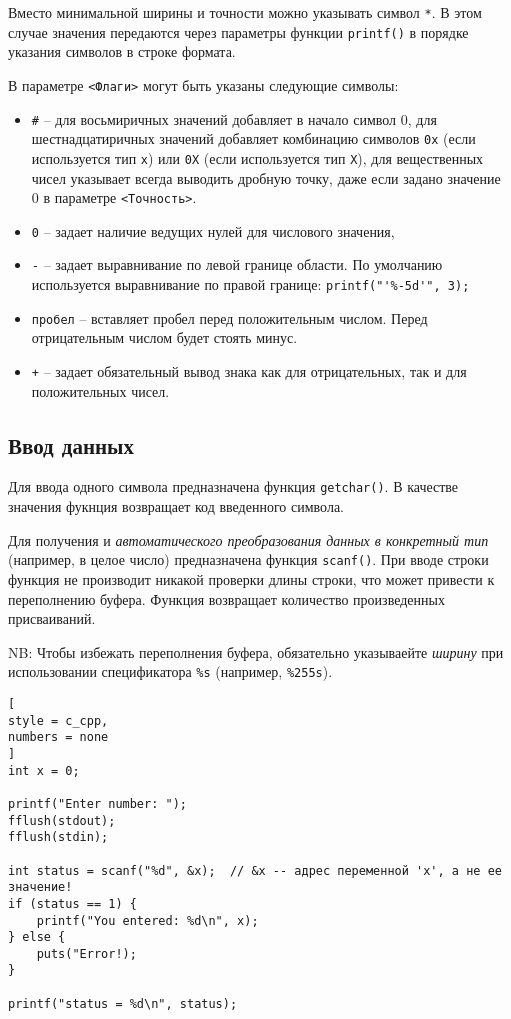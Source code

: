 \documentclass[%
	11pt,
	a4paper,
	utf8,
		]{article}
\begin{document}
Вместо минимальной ширины и точности можно указывать символ \verb*|*|. В этом случае значения передаются через параметры функции \verb*|printf()| в порядке указания символов в строке формата.

В параметре \verb|<Флаги>| могут быть указаны следующие символы:
\begin{itemize}
	\item \verb*|#| -- для восьмиричных значений добавляет в начало символ 0, для шестнадцатиричных значений добавляет комбинацию символов \verb|0x| (если используется тип \verb*|x|) или \verb|0X| (если используется тип \verb*|X|), для вещественных чисел указывает всегда выводить дробную точку, даже если задано значение 0 в параметре \verb|<Точность>|.
	
	\item \verb*|0| -- задает наличие ведущих нулей для числового значения,
	
	\item \verb|-| -- задает выравнивание по левой границе области. По умолчанию используется выравнивание по правой границе: \verb|printf("'%-5d'", 3);|
	
	\item \verb|пробел| -- вставляет пробел перед положительным числом. Перед отрицательным числом будет стоять минус.
	
	\item \verb*|+| -- задает обязательный вывод знака как для отрицательных, так и для положительных чисел.
\end{itemize}

\subsection{Ввод данных}

Для ввода одного символа предназначена функция \verb*|getchar()|. В качестве значения фукнция возвращает код введенного символа.

Для получения и \emph{автоматического преобразования данных в конкретный тип} (например, в целое число) предназначена функция \verb*|scanf()|. При вводе строки функция не производит никакой проверки длины строки, что может привести к переполнению буфера. Функция возвращает количество произведенных присваиваний.

NB: Чтобы избежать переполнения буфера, обязательно указываейте \emph{ширину} при использовании спецификатора \verb*|%s| (например, \verb|%255s|).

\begin{lstlisting}[
style = c_cpp,
numbers = none
]
int x = 0;

printf("Enter number: ");
fflush(stdout);
fflush(stdin);

int status = scanf("%d", &x);  // &x -- адрес переменной 'x', а не ее значение!
if (status == 1) {
    printf("You entered: %d\n", x);
} else {
    puts("Error!);
}

printf("status = %d\n", status);
\end{lstlisting}
\end{document}
